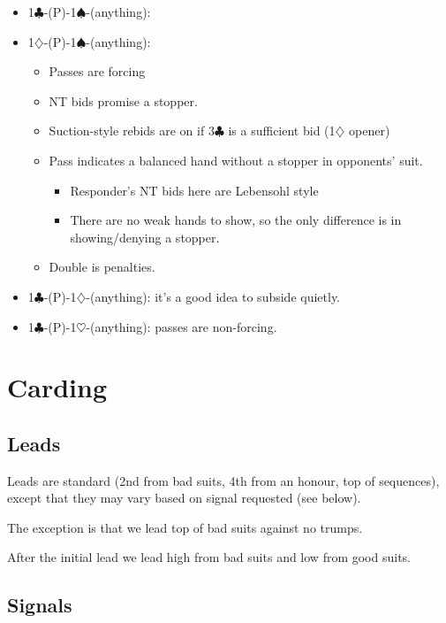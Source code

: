 \documentclass[a4paper,12pt]{article}
\begin{document}
\begin{itemize}
\item 1$\clubsuit$-(P)-1$\spadesuit$-(anything):
\item 1$\diamondsuit$-(P)-1$\spadesuit$-(anything):
\begin{itemize}
   \item Passes are forcing
   \item NT bids promise a stopper.
   \item Suction-style rebids are on if 3$\clubsuit$ is a sufficient bid (1$\diamondsuit$ opener)
   \item Pass indicates a balanced hand without a stopper in opponents' suit.
	\begin{itemize}
      \item Responder's NT bids here are Lebensohl style
      \item There are no weak hands to show, so the only difference is in showing/denying a stopper.
		\end{itemize}
   \item Double is penalties.
	\end{itemize}

\item 1$\clubsuit$-(P)-1$\diamondsuit$-(anything): it's a good idea to subside quietly.  

\item 1$\clubsuit$-(P)-1$\heartsuit$-(anything): passes are non-forcing. 
\end{itemize}

\section{Carding}

\subsection{Leads}

Leads are standard (2nd from bad suits, 4th from an honour, top of sequences),
except that they may vary based on signal requested (see below).

The exception is that we lead top of bad suits against no trumps.

After the initial lead we lead high from bad suits and low from good suits.

\subsection{Signals}
\end{document}
